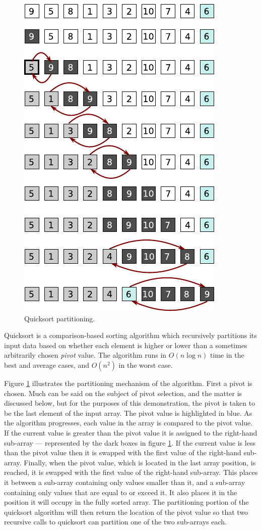 \documentclass[12pt, a4paper]{article}
\begin{document}
\begin{figure}
    \centering
    \includegraphics{quicksort.pdf}
    \caption{\label{fig:quicksort_1}Quicksort partitioning.}
\end{figure}

Quicksort is a comparison-based sorting algorithm which recursively partitions its input data based on whether each element is higher or lower than a sometimes arbitrarily chosen \emph{pivot} value. The algorithm runs in $O(n\log n)$ time in the best and average cases, and $O (n^{2})$ in the worst case.

Figure \ref{fig:quicksort_1} illustrates the partitioning mechanism of the algorithm. First a pivot is chosen. Much can be said on the subject of pivot selection, and the matter is discussed below, but for the purposes of this demonstration, the pivot is taken to be the last element of the input array. The pivot value is highlighted in blue. As the algorithm progresses, each value in the array is compared to the pivot value. If the current value is greater than the pivot value it is assigned to the right-hand sub-array — represented by the dark boxes in figure \ref{fig:quicksort_1}. If the current value is less than the pivot value then it is swapped with the first value of the right-hand sub-array. Finally, when the pivot value, which is located in the last array position, is reached, it is swapped with the first value of the right-hand sub-array. This places it between a sub-array containing only values smaller than it, and a sub-array containing only values that are equal to or exceed it. It also places it in the position it will occupy in the fully sorted array. The partitioning portion of the quicksort algorithm will then return the location of the pivot value so that two recursive calls to quicksort can partition one of the two sub-arrays each.
\end{document}
